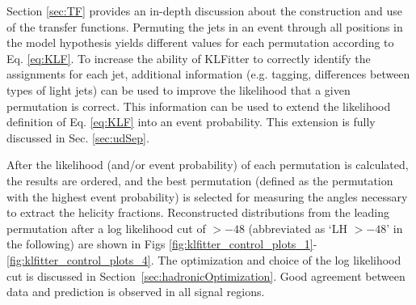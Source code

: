 Section \ref{sec:TF} provides an in-depth discussion about the construction and use of the transfer functions. Permuting the jets in an event through all positions in the model hypothesis yields different values for each permutation according to Eq. \ref{eq:KLF}. To increase the ability of KLFitter to correctly identify the assignments for each jet, additional information (e.g. \bt tagging, differences between types of light jets) can be used to improve the likelihood that a given permutation is correct.  This information can be used to extend the likelihood definition of Eq. \ref{eq:KLF} into an event probability. This extension is fully discussed in Sec. \ref{sec:udSep}.

After the likelihood (and/or event probability) of each permutation is calculated, the results are ordered, and the best permutation (defined as the permutation with the highest event probability) is selected for measuring the angles necessary to extract the helicity fractions. Reconstructed distributions from the leading permutation after a log likelihood cut of $> -48$ (abbreviated as `LH $> -48$' in the following) are shown in Figs \ref{fig:klfitter_control_plots_1}-\ref{fig:klfitter_control_plots_4}. The optimization and choice of the log likelihood cut is discussed in Section~\ref{sec:hadronicOptimization}. Good agreement between data and prediction is observed in all signal regions.

